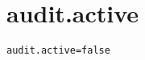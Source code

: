 \section{audit.active}
\label{configuration:AuditActive}
\ClearAPI
\TODO
{}
\begin{lstlisting}[style=Props,caption={Usage example for \textit{audit.active}}]
audit.active=false
\end{lstlisting}